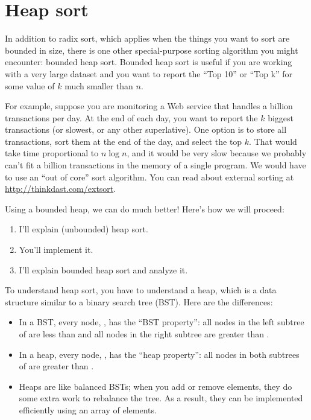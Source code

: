 \documentclass[12pt]{book}
\theoremstyle{exercise}
\begin{document}
\section{Heap sort}
\label{heap-sort}


In addition to radix sort, which applies when the things you want to
sort are bounded in size, there is one other special-purpose sorting
algorithm you might encounter: bounded heap sort. Bounded heap sort is
useful if you are working with a very large dataset and you want to
report the ``Top 10'' or ``Top k'' for some value of $k$ much
smaller than $n$.

For example, suppose you are monitoring a Web service that handles a
billion transactions per day. At the end of each day, you want to
report the $k$ biggest transactions (or slowest, or any other
superlative). One option is to store all transactions, sort them at
the end of the day, and select the top $k$. That would take time
proportional to $n \log n$, and it would be very slow because we
probably can't fit a billion transactions in the memory of a single
program. We would have to use an ``out of core'' sort algorithm. You
can read about external sorting at \url{http://thinkdast.com/extsort}.


Using a bounded heap, we can do much better! Here's how we will
proceed:

\begin{enumerate}

\item
  I'll explain (unbounded) heap sort.

\item
  You'll implement it.

\item
  I'll explain bounded heap sort and analyze it.

\end{enumerate}


To understand heap sort, you have to understand a heap, which is a data
structure similar to a binary search tree (BST). Here are the differences:

\begin{itemize}

\item
  In a BST, every node, , has the ``BST property'': all nodes
  in the left subtree of  are less than  and all
  nodes in the right subtree are greater than .

\item
  In a heap, every node, , has the ``heap property'': all
  nodes in both subtrees of  are greater than .

\item
  Heaps are like balanced BSTs; when you add or remove elements, they
  do some extra work to rebalance the tree.  As a result, they can
  be implemented efficiently using an array of elements.

\end{itemize}
\end{document}
